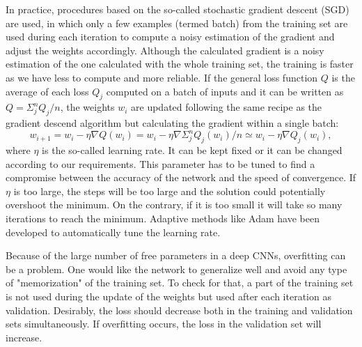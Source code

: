 In practice,
procedures based on the so-called stochastic gradient descent (SGD) are used, in which
only a few examples (termed batch) from the training set are used
during each iteration to compute a noisy estimation of the gradient and adjust the weights 
accordingly. Although the calculated gradient is a noisy estimation of the one calculated with the whole training set, the training is faster as we have less to compute and
more reliable. If the general loss function $Q$ is the average of each loss $Q_j$  computed on a batch of inputs and it can be written as $Q=\Sigma_j^n Q_j/n$, the weights $w_i$ are updated following the same recipe as the 
gradient descend algorithm but calculating the gradient within a single batch:
\begin{equation}
w_{i+1} = w_i -\eta\nabla Q(w_i) = w_i -\eta\nabla\Sigma_j^n Q_j(w_i)/n \simeq w_i -\eta\nabla Q_j(w_i),
\end{equation}
where $\eta$ is the so-called learning rate.
It can be kept fixed or it can be changed according to our requirements. This parameter has to be tuned to find a compromise between the accuracy of the network and the speed of convergence. If $\eta$ is too large, the steps will be too large and the solution could 
potentially overshoot the minimum. On the contrary, if it is too small it will take so many iterations to reach the minimum. Adaptive methods like
Adam \cite{adam14} have been developed to automatically tune the
learning rate.


Because of the large number of free parameters in a deep CNNs, overfitting can be 
a problem. One would like the network to generalize well and avoid any type of "memorization" of
the training set. To check for that, a part of the training set is not used during the update
of the weights but used after each iteration as validation. Desirably, the loss should
decrease both in the training and validation sets simultaneously. If overfitting occurs, the
loss in the validation set will increase.

